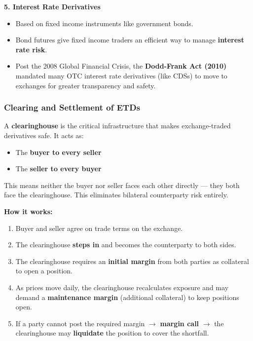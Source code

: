 \documentclass[12pt,openany]{book}
\begin{document}
\textbf{5. Interest Rate Derivatives}
\begin{itemize}[leftmargin=*]
    \item Based on fixed income instruments like government bonds.
    \item Bond futures give fixed income traders an efficient way to manage \textbf{interest rate risk}.
    \item Post the 2008 Global Financial Crisis, the \textbf{Dodd-Frank Act (2010)} mandated many OTC interest rate derivatives (like CDSs) to move to exchanges for greater transparency and safety.
\end{itemize}

\subsubsection{Clearing and Settlement of ETDs}

A \textbf{clearinghouse} is the critical infrastructure that makes exchange-traded derivatives safe. It acts as:
\begin{itemize}[leftmargin=*]
    \item The \textbf{buyer to every seller}
    \item The \textbf{seller to every buyer}
\end{itemize}

This means neither the buyer nor seller faces each other directly --- they both face the clearinghouse. This eliminates bilateral counterparty risk entirely.

\textbf{How it works:}

\begin{enumerate}[leftmargin=*]
    \item Buyer and seller agree on trade terms on the exchange.
    \item The clearinghouse \textbf{steps in} and becomes the counterparty to both sides.
    \item The clearinghouse requires an \textbf{initial margin} from both parties as collateral to open a position.
    \item As prices move daily, the clearinghouse recalculates exposure and may demand a \textbf{maintenance margin} (additional collateral) to keep positions open.
    \item If a party cannot post the required margin $\rightarrow$ \textbf{margin call} $\rightarrow$ the clearinghouse may \textbf{liquidate} the position to cover the shortfall.
\end{enumerate}
\end{document}
